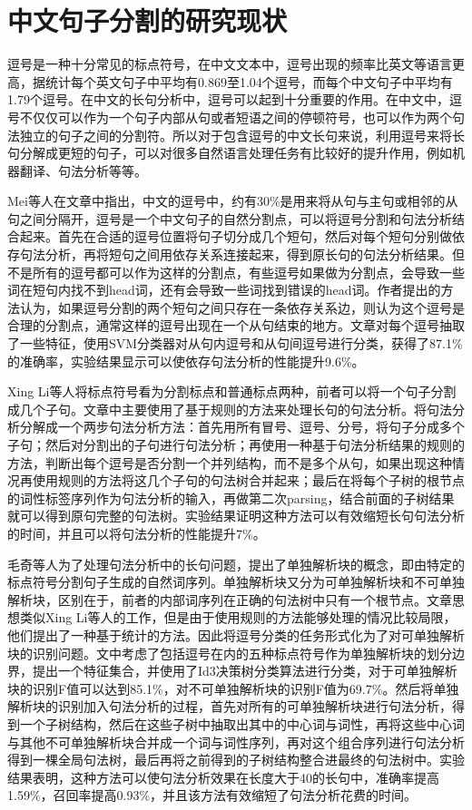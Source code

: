 \documentclass[master, winfont]{njuthesis}
\begin{document}
\section{中文句子分割的研究现状}
逗号是一种十分常见的标点符号，在中文文本中，逗号出现的频率比英文等语言更高，据统计每个英文句子中平均有0.869至1.04个逗号，而每个中文句子中平均有1.79个逗号\cite{Jin2004}。在中文的长句分析中，逗号可以起到十分重要的作用。在中文中，逗号不仅仅可以作为一个句子内部从句或者短语之间的停顿符号\cite{Li2004}，也可以作为两个句法独立的句子之间的分割符\cite{Xu2013}\cite{Xue2011}。所以对于包含逗号的中文长句来说，利用逗号来将长句分解成更短的句子，可以对很多自然语言处理任务有比较好的提升作用，例如机器翻译\cite{Wang2014}、句法分析\cite{Jin2004}\cite{Li2004}\cite{MQ}\cite{Kong2014}\cite{Li2004}\cite{Li2008}等等。

Mei等人\cite{Jin2004}在文章中指出，中文的逗号中，约有30\%是用来将从句与主句或相邻的从句之间分隔开，逗号是一个中文句子的自然分割点，可以将逗号分割和句法分析结合起来。首先在合适的逗号位置将句子切分成几个短句，然后对每个短句分别做依存句法分析，再将短句之间用依存关系连接起来，得到原长句的句法分析结果。但不是所有的逗号都可以作为这样的分割点，有些逗号如果做为分割点，会导致一些词在短句内找不到head词，还有会导致一些词找到错误的head词。作者提出的方法认为，如果逗号分割的两个短句之间只存在一条依存关系边，则认为这个逗号是合理的分割点，通常这样的逗号出现在一个从句结束的地方。文章对每个逗号抽取了一些特征，使用SVM分类器对从句内逗号和从句间逗号进行分类，获得了87.1\%的准确率，实验结果显示可以使依存句法分析的性能提升9.6\%。

Xing Li等人\cite{Li2004}将标点符号看为分割标点和普通标点两种，前者可以将一个句子分割成几个子句。文章中主要使用了基于规则的方法来处理长句的句法分析。将句法分析分解成一个两步句法分析方法：首先用所有冒号、逗号、分号，将句子分成多个子句；然后对分割出的子句进行句法分析；再使用一种基于句法分析结果的规则的方法，判断出每个逗号是否分割一个并列结构，而不是多个从句，如果出现这种情况再使用规则的方法将这几个子句的句法树合并起来；最后在将每个子树的根节点的词性标签序列作为句法分析的输入，再做第二次parsing，结合前面的子树结果就可以得到原句完整的句法树。实验结果证明这种方法可以有效缩短长句句法分析的时间，并且可以将句法分析的性能提升7\%。

毛奇等人\cite{MQ}为了处理句法分析中的长句问题，提出了单独解析块的概念，即由特定的标点符号分割句子生成的自然词序列。单独解析块又分为可单独解析块和不可单独解析块，区别在于，前者的内部词序列在正确的句法树中只有一个根节点。文章思想类似Xing Li等人\cite{Li2004}的工作，但是由于使用规则的方法能够处理的情况比较局限，他们提出了一种基于统计的方法。因此将逗号分类的任务形式化为了对可单独解析块的识别问题。文中考虑了包括逗号在内的五种标点符号作为单独解析块的划分边界，提出一个特征集合，并使用了Id3决策树分类算法进行分类，对于可单独解析块的识别F值可以达到85.1\%，对不可单独解析块的识别F值为69.7\%。然后将单独解析块的识别加入句法分析的过程，首先对所有的可单独解析块进行句法分析，得到一个子树结构，然后在这些子树中抽取出其中的中心词与词性，再将这些中心词与其他不可单独解析块合并成一个词与词性序列，再对这个组合序列进行句法分析得到一棵全局句法树，最后再将之前得到的子树结构整合进最终的句法树中。实验结果表明，这种方法可以使句法分析效果在长度大于40的长句中，准确率提高1.59\%，召回率提高0.93\%，并且该方法有效缩短了句法分析花费的时间。
\end{document}
